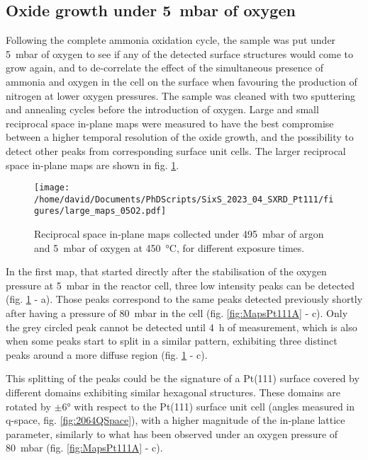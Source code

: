 \subsection{Oxide growth under \qty{5}{\milli\bar} of oxygen}

Following the complete ammonia oxidation cycle, the sample was put under \qty{5}{\milli\bar} of oxygen to see if any of the detected surface structures would come to grow again, and to de-correlate the effect of the simultaneous presence of ammonia and oxygen in the cell on the surface when favouring the production of nitrogen at lower oxygen pressures.
The sample was cleaned with two sputtering and annealing cycles before the introduction of oxygen.
Large and small reciprocal space in-plane maps were measured to have the best compromise between a higher temporal resolution of the oxide growth, and the possibility to detect other peaks from corresponding surface unit cells.
The larger reciprocal space in-plane maps are shown in fig. \ref{fig:LargeMapsPt111LowOxygen}.

\begin{figure}[!htb]
    \centering
    \texttt{[image: /home/david/Documents/PhDScripts/SixS\_2023\_04\_SXRD\_Pt111/figures/large\_maps\_05O2.pdf]}
    \caption{
        Reciprocal space in-plane maps collected under \qty{495}{\milli\bar} of argon and \qty{5}{\milli\bar} of oxygen at \qty{450}{\degreeCelsius}, for different exposure times.
    }
    \label{fig:LargeMapsPt111LowOxygen}
\end{figure}

In the first map, that started directly after the stabilisation of the oxygen pressure at \qty{5}{\milli\bar} in the reactor cell, three low intensity peaks can be detected (fig. \ref{fig:LargeMapsPt111LowOxygen} - a).
Those peaks correspond to the same peaks detected previously shortly after having a pressure of \qty{80}{\milli\bar} in the cell (fig. \ref{fig:MapsPt111A} - c).
Only the grey circled peak cannot be detected until \qty{4}{\hour} of measurement, which is also when some peaks start to split in a similar pattern, exhibiting three distinct peaks around a more diffuse region (fig. \ref{fig:LargeMapsPt111LowOxygen} - c).

This splitting of the peaks could be the signature of a Pt(111) surface covered by different domains exhibiting similar hexagonal structures.
These domains are rotated by $\pm \ang{6}$ with respect to the Pt(111) surface unit cell (angles measured in q-space, fig. \ref{fig:2064QSpace}), with a higher magnitude of the in-plane lattice parameter, similarly to what has been observed under an oxygen pressure of \qty{80}{\milli\bar} (fig. \ref{fig:MapsPt111A} - c).

